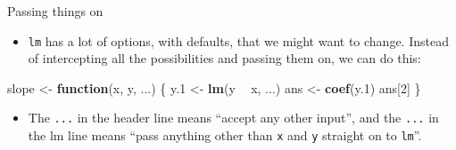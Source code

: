 \documentclass[
  ignorenonframetext,
]{beamer}
\newenvironment{Shaded}{\begin{snugshade}}{\end{snugshade}}
\newcommand{\ControlFlowTok}[1]{\textcolor[rgb]{0.13,0.29,0.53}{\textbf{#1}}}
\newcommand{\DecValTok}[1]{\textcolor[rgb]{0.00,0.00,0.81}{#1}}
\newcommand{\FloatTok}[1]{\textcolor[rgb]{0.00,0.00,0.81}{#1}}
\newcommand{\KeywordTok}[1]{\textcolor[rgb]{0.13,0.29,0.53}{\textbf{#1}}}
\newcommand{\NormalTok}[1]{#1}
\newcommand{\OperatorTok}[1]{\textcolor[rgb]{0.81,0.36,0.00}{\textbf{#1}}}
\newcommand{\StringTok}[1]{\textcolor[rgb]{0.31,0.60,0.02}{#1}}
\providecommand{\tightlist}{%
  \setlength{\itemsep}{0pt}\setlength{\parskip}{0pt}}
\begin{document}
\begin{frame}[fragile]{Passing things on}
\protect\hypertarget{passing-things-on}{}

\begin{itemize}
\tightlist
\item
  \texttt{lm} has a lot of options, with defaults, that we might want to
  change. Instead of intercepting all the possibilities and passing them
  on, we can do this:
\end{itemize}

\begin{Shaded}
\begin{Highlighting}[]
\NormalTok{slope <-}\StringTok{ }\ControlFlowTok{function}\NormalTok{(x, y, ...) \{}
\NormalTok{  y}\FloatTok{.1}\NormalTok{ <-}\StringTok{ }\KeywordTok{lm}\NormalTok{(y }\OperatorTok{~}\StringTok{ }\NormalTok{x, ...)}
\NormalTok{  ans <-}\StringTok{ }\KeywordTok{coef}\NormalTok{(y}\FloatTok{.1}\NormalTok{)}
\NormalTok{  ans[}\DecValTok{2}\NormalTok{]}
\NormalTok{\}}
\end{Highlighting}
\end{Shaded}

\begin{itemize}
\tightlist
\item
  The \texttt{...} in the header line means ``accept any other input'',
  and the \texttt{...} in the lm line means ``pass anything other than
  \texttt{x} and \texttt{y} straight on to \texttt{lm}''.
\end{itemize}

\end{frame}
\end{document}
